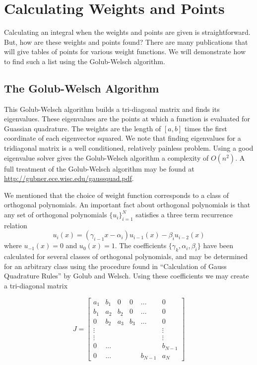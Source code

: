 \section*{Calculating Weights and Points} %

Calculating an integral when the weights and points are given is straightforward.
But, how are these weights and points found?
There are many publications that will give tables of points for various weight functions.
We will demonstrate how to find such a list using the Golub-Welsch algorithm.

\subsection*{The Golub-Welsch Algorithm} %

This Golub-Welsch algorithm builds a tri-diagonal matrix and finds its eigenvalues.
These eigenvalues are the points at which a function is evaluated for Guassian quadrature.
The weights are the length of $\left[a, b\right]$ times the first coordinate of each eigenvector squared.
We note that finding eigenvalues for a tridiagonal matrix is a well conditioned, relatively painless problem.
Using a good eigenvalue solver gives the Golub-Welsch algorithm a complexity of $O(n^2)$.
A full treatment of the Golub-Welsch algorithm may be found at \url{http://gubner.ece.wisc.edu/gaussquad.pdf}.

We mentioned that the choice of weight function corresponds to a class of orthogonal polynomials.
An important fact about orthogonal polynomials is that any set of orthogonal polynomials $\{u_i\}_{i=1}^{N}$ satisfies a three term recurrence relation
\[
u_{i}(x) = (\gamma_{i-1}x-\alpha_i)u_{i-1}(x) - \beta_iu_{i-2}(x)
\]
where $u_{-1}(x) = 0$ and $u_0(x) = 1$.
The coefficients $\{\gamma_k, \alpha_i, \beta_i\}$ have been calculated for several classes of orthogonal polynomials, and may be determined for an arbitrary class using the procedure found in ``Calculation of Gauss Quadrature Rules'' by Golub and Welsch.
Using these coefficients we may create a tri-diagonal matrix

\[
J = \begin{bmatrix}

a_1 & b_1 & 0 & 0 & ... & 0 \\
b_1 & a_2 & b_2 & 0 & ... & 0 \\
0 & b_2 & a_3 & b_3 & ... & 0 \\
\vdots & & & & & \vdots \\
\vdots & & & & & \vdots \\
0 & ... & & & & b_{N-1} \\
0 & ... & & & b_{N-1} & a_N

\end{bmatrix}
\]

